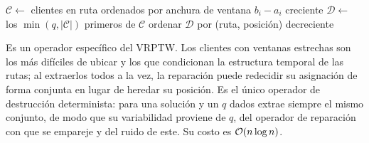 \begin{algorithm}[H]
\caption{ ()}
\label{alg:tw}
$\mathcal{C}\gets$ clientes en ruta ordenados por anchura de ventana $b_i-a_i$ creciente\;
$\mathcal{D}\gets$ los $\min(q,|\mathcal{C}|)$ primeros de $\mathcal{C}$\;
ordenar $\mathcal{D}$ por (ruta, posición) decreciente 
\end{algorithm}

Es un operador específico del VRPTW. Los clientes con ventanas estrechas son los más difíciles
de ubicar y los que condicionan la estructura temporal de las rutas; al extraerlos todos a la
vez, la reparación puede redecidir su asignación de forma conjunta en lugar de heredar su
posición. Es el único operador de destrucción determinista: para una solución y un $q$ dados
extrae siempre el mismo conjunto, de modo que su variabilidad proviene de $q$, del operador de
reparación con que se empareje y del ruido de este. Su costo es $\mathcal{O}(n\log n)$.
